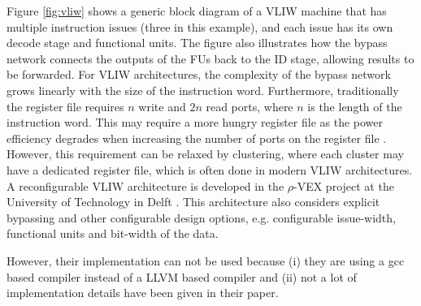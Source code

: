 Figure \ref{fig:vliw} shows a generic block diagram of a VLIW machine that has multiple instruction issues (three in this example), and each issue has its own decode stage and functional units. The figure also illustrates how the bypass network connects the outputs of the FUs back to the ID stage, allowing results to be forwarded. For VLIW architectures, the complexity of the bypass network grows linearly with the size of the instruction word. Furthermore, traditionally the register file requires $n$ write and $2n$ read ports, where $n$ is the length of the instruction word. This may require a more hungry register file as the power efficiency degrades when increasing the number of ports on the register file \cite{compiler_driven_power_opt}. However, this requirement can be relaxed by clustering, where each cluster may have a dedicated register file, which is often done in modern VLIW architectures.\\

A reconfigurable VLIW architecture is developed in the $\rho$-VEX project at the University of Technology in Delft \cite{p-vex}. This architecture also considers explicit bypassing and other configurable design options, e.g. configurable issue-width, functional units and bit-width of the data.

However, their implementation can not be used because (i) they are using a gcc based compiler instead of a LLVM based compiler and (ii) not a lot of implementation details have been given in their paper.





